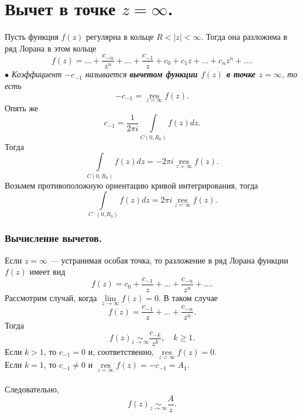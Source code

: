 \documentclass[a4paper, 12pt]{article}
\renewcommand{\geq}{\geqslant}
\newcommand{\res}{\operatorname{res}}
\newcommand{\resinf}{\underset{z = \infty}{\res}f(z)}
\begin{document}
\section{Вычет в точке $z=\infty$.}
Пусть функция $f(z)$ регулярна в кольце $R<|z|<\infty$. Тогда она разложима в ряд Лорана в этом кольце $$f(z) = \ldots + \dfrac{c_{-n}}{z^n} + \ldots + \dfrac{c_{-1}}{z} + c_0 + c_1z + \ldots + c_nz^n + \ldots.$$
$\bullet$ \textit{Коэффициент $-c_{-1}$ называется \textbf{вычетом функции $f(z)$ в точке $z = \infty$}, то есть} $$-c_{-1} = \underset{z = \infty}{\res}f(z).$$
Опять же $$c_{-1} = \dfrac{1}{2\pi i }\int\limits_{C(0, R_0)}f(z) dz.$$
Тогда $$\int\limits_{C(0, R_0)}f(z) dz = -2\pi i \resinf.$$
Возьмем противоположную ориентацию кривой интегрирования, тогда
$$\int\limits_{C^-(0, R_0)}f(z) dz = 2\pi i \resinf.$$
\subsubsection*{Вычисление вычетов.}
Если $z = \infty$ --- устранимая особая точка, то разложение в ряд Лорана функции $f(z)$ имеет вид $$f(z) = c_0 + \dfrac{c_{-1}}{z} + \ldots + \dfrac{c_{-n}}{z^n} + \ldots.$$
Рассмотрим случай, когда $\lim\limits_{z \to \infty} f(z) = 0$. В таком случае $$f(z) = \dfrac{c_{-1}}{z} + \ldots + \dfrac{c_{-n}}{z^n}.$$
Тогда $$f(z) \underset{z \to \infty}{\sim} \dfrac{c_{-k}}{z^k},\quad k \geq 1.$$
Если $k> 1$, то $c_{-1} = 0$ и, соответственно, $\resinf = 0$.\\
Если $k=1$, то $c_{-1}\ne 0$ и $\resinf = -c_{-1} = A_1$.\\\\ Следовательно, $$f(z)\underset{z \to \infty}{\sim} \dfrac{A}{z}.$$
\end{document}
